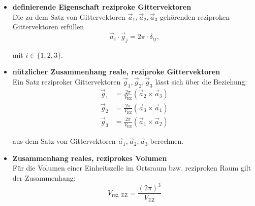 \documentclass{article}
\begin{document}
	\begin{itemize}
		\item \textbf{definierende Eigenschaft reziproke Gittervektoren}\\
		Die zu dem Satz von Gittervektoren $\vec{a}_1, \vec{a}_2, \vec{a}_3$ gehörenden reziproken Gittervektoren erfüllen
			\begin{equation}
				\vec{a}_i \cdot \vec{g}_j = 2\pi \cdot \delta_{ij},
			\end{equation}
		
		mit $i \in \{1,2,3\}$.

		
		\item \textbf{nützlicher Zusammenhang reale, reziproke Gittervektoren}\\
		Ein Satz reziproker Gittervektoren $\vec{g}_1, \vec{g}_2, \vec{g}_3$ lässt sich über die Beziehung:
			\begin{align}
				\vec{g}_1 &= \frac{2\pi}{V_\text{EZ}}(\vec{a}_2 \times \vec{a}_3) \\
				\vec{g}_2 &= \frac{2\pi}{V_\text{EZ}}(\vec{a}_3 \times \vec{a}_1) \\
				\vec{g}_3 &= \frac{2\pi}{V_\text{EZ}}(\vec{a}_1 \times \vec{a}_2)
			\end{align}
		
		aus dem Satz von Gittervektoren $\vec{a}_1,\vec{a}_2,\vec{a}_3$ berechnen.
		
		
		\item \textbf{Zusammenhang reales, reziprokes Volumen}\\
		Für die Volumen einer Einheitszelle im Ortsraum bzw. reziproken Raum gilt der Zusammenhang:
			\begin{equation}
				V_\text{rez. EZ} = \frac{(2\pi)^3}{V_\text{EZ}}
			\end{equation}
	\end{itemize}


\newpage
\end{document}
